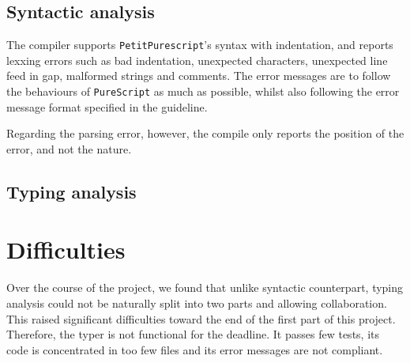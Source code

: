 \documentclass{amsart}
\begin{document}
	\subsection{Syntactic analysis}
	
	The compiler supports \texttt{PetitPurescript}'s syntax with indentation, and reports lexxing errors such as bad indentation, unexpected characters, unexpected line feed in gap, malformed strings and comments. The error messages are to follow the behaviours of \texttt{PureScript} as much as possible, whilst also following the error message format specified in the guideline.
	
	Regarding the parsing error, however, the compile only reports the position of the error, and not the nature.
	
	\subsection{Typing analysis}
	
	\section{Difficulties}
	
	Over the course of the project, we found that unlike syntactic counterpart, typing analysis could not be naturally split into two parts and allowing collaboration. This raised significant difficulties toward the end of the first part of this project. Therefore, the typer is not functional for the deadline. It passes few tests, its code is concentrated in too few files and its error messages are not compliant.
	
\end{document}
